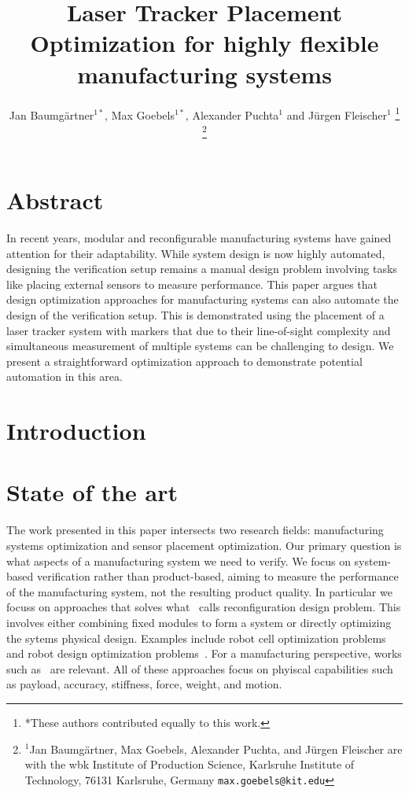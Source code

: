 \documentclass{svproc}
\title{\LARGE \bf
Laser Tracker Placement Optimization for highly flexible manufacturing systems
}
\author{Jan Baumgärtner$^{1*}$, Max Goebels$^{1*}$,   Alexander Puchta$^{1}$ and Jürgen Fleischer$^{1}$%
\thanks{*These authors contributed equally to this work.}%
\thanks{$^{1}$Jan Baumgärtner, Max Goebels, Alexander Puchta, and Jürgen Fleischer are with the wbk Institute of Production Science,
        Karlsruhe Institute of Technology, 76131 Karlsruhe, Germany
        {\tt\small max.goebels@kit.edu}}%
}
\begin{document}
\maketitle
\thispagestyle{empty}
\pagestyle{empty}

\section*{Abstract}
In recent years, modular and reconfigurable manufacturing systems have gained attention for their adaptability. 
While system design is now highly automated, designing the verification setup remains a manual design problem involving tasks like placing external sensors to measure performance. 
This paper argues that design optimization approaches for manufacturing systems can also automate the design of the verification setup.
This is demonstrated using the placement of a laser tracker system with markers that due to their line-of-sight complexity and simultaneous measurement of multiple systems can be challenging to design.
We present a straightforward optimization approach to demonstrate potential automation in this area.
\section{Introduction}

\section{State of the art}
The work presented in this paper intersects two research fields: manufacturing systems optimization and sensor placement optimization. 
Our primary question is what aspects of a manufacturing system we need to verify. 
We focus on system-based verification rather than product-based, aiming to measure the performance of the manufacturing system, not the resulting product quality.
In particular we focuss on approaches that solves what~\cite{reconfigurable_production} calls reconfiguration design problem.
This involves either combining fixed modules to form a system or directly optimizing the sytems physical design.
 Examples include robot cell optimization problems~\cite{previous_work, stiffness_placement} and robot design optimization problems~\cite{task_synthesis, ad-hoc_manipulator, multi_objective}. 
 For a manufacturing perspective, works such as~\cite{johannes_1, johannes_2} are relevant.
 All of these approaches focus on phyiscal capabilities such as payload, accuracy, stiffness, force, weight, and motion.
\end{document}

